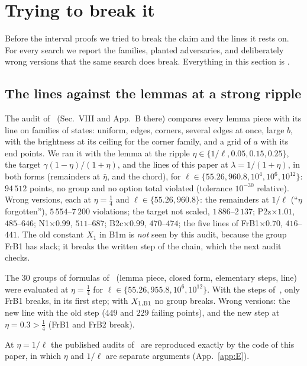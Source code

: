 \section{Trying to break it}
\label{sec:break}

Before the interval proofs we tried to break the claim and the lines it rests on.
For every search we report the families, planted adversaries, and deliberately wrong versions that the same search does break.
Everything in this section is \numst.

\subsection{The lines against the lemmas at a strong ripple}
The audit of~\cite{I} (Sec.~VIII and App.~B there) compares every lemma piece with its line on families of states: uniform, edges, corners, several edges at once, large $b$, with the brightness at its ceiling for the corner family, and a grid of $a$ with its end points.
We ran it with the lemma at the ripple $\eta\in\{1/\ell,0.05,0.15,0.25\}$, the target $\gamma(1-\eta)/(1+\eta)$, and the lines of this paper at $\lambda=1/(1+\eta)$, in both forms (remainders at $\bar\eta$, and the chord), for $\ell\in\{55.26,960.8,10^4,10^6,10^{12}\}$: $94\,512$ points, no group and no option total violated (tolerance $10^{-30}$ relative).
Wrong versions, each at $\eta=\tfrac14$ and $\ell\in\{55.26,960.8\}$: the remainders at $1/\ell$ (``$\eta$ forgotten''), $5\,554$--$7\,200$ violations; the target not scaled, $1\,886$--$2\,137$; P2z$\times1.01$, $485$--$646$; N1$\times0.99$, $511$--$687$; B2c$\times0.99$, $470$--$474$; the five lines of FrB1$\times0.70$, $416$--$441$.
The old constant $X_1$ in B1m is \emph{not} seen by this audit, because the group FrB1 has slack; it breaks the written step of the chain, which the next audit checks.

The 30 groups of formulas of~\cite{I} (lemma piece, closed form, elementary steps, line) were evaluated at $\eta=\tfrac14$ for $\ell\in\{55.26,955.8,10^6,10^{12}\}$.
With the steps of~\cite{I}, only FrB1 breaks, in its first step; with $X_{1,\rm B1}$ no group breaks.
Wrong versions: the new line with the old step ($449$ and $229$ failing points), and the new step at $\eta=0.3>\tfrac14$ (FrB1 and FrB2 break).

At $\eta=1/\ell$ the published audits of~\cite{I} are reproduced exactly by the code of this paper, in which $\eta$ and $1/\ell$ are separate arguments (App.~\ref{app:E}).

